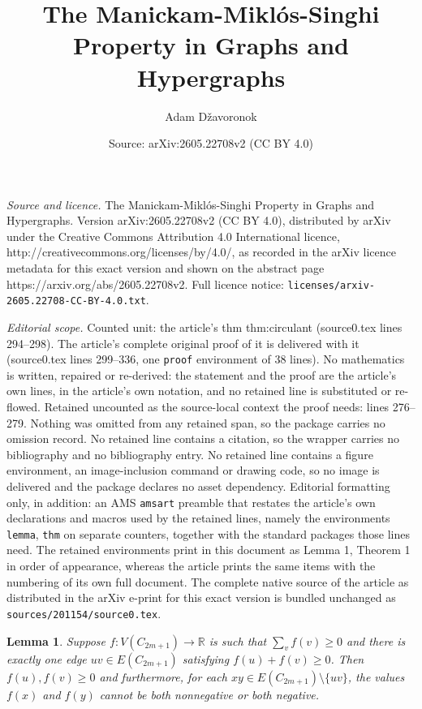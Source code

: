 \documentclass[10pt,a4paper]{amsart}
\title{The Manickam-Mikl\'os-Singhi Property in Graphs and Hypergraphs}
\author{Adam D\v{z}avoronok}
\date{Source: arXiv:2605.22708v2 (CC BY 4.0)}
\newtheorem{lemma}{Lemma}
\begin{document}
\maketitle

\noindent\emph{Source and licence.} The Manickam-Mikl\'os-Singhi Property in Graphs and Hypergraphs. Version arXiv:2605.22708v2 (CC BY 4.0), distributed by arXiv under the Creative Commons Attribution 4.0 International licence, http://creativecommons.org/licenses/by/4.0/, as recorded in the arXiv licence metadata for this exact version and shown on the abstract page https://arxiv.org/abs/2605.22708v2. Full licence notice: \texttt{licenses/arxiv-2605.22708-CC-BY-4.0.txt}.\par\smallskip

\noindent\textit{Editorial scope.} Counted unit: the article's thm thm:circulant (source0.tex lines 294--298). The article's complete original proof of it is delivered with it (source0.tex lines 299--336, one \texttt{proof} environment of 38 lines). No mathematics is written, repaired or re-derived: the statement and the proof are the article's own lines, in the article's own notation, and no retained line is substituted or re-flowed.  Retained uncounted as the source-local context the proof needs: lines 276--279.  Nothing was omitted from any retained span, so the package carries no omission record.  No retained line contains a citation, so the wrapper carries no bibliography and no bibliography entry.  No retained line contains a figure environment, an image-inclusion command or drawing code, so no image is delivered and the package declares no asset dependency.  Editorial formatting only, in addition: an AMS \texttt{amsart} preamble that restates the article's own declarations and macros used by the retained lines, namely the environments \texttt{lemma}, \texttt{thm} on separate counters, together with the standard packages those lines need.  The retained environments print in this document as Lemma 1, Theorem 1 in order of appearance, whereas the article prints the same items with the numbering of its own full document.  The complete native source of the article as distributed in the arXiv e-print for this exact version is bundled unchanged as \texttt{sources/201154/source0.tex}.
 \begin{lemma}\label{lem:unique-cycle}
  Suppose $f:V(C_{2m+1})\rightarrow \mathbb{R}$ is such that $\sum_v f(v)\ge0$ and there is exactly one edge $uv\in E(C_{2m+1})$ satisfying $f(u)+f(v)\ge0$.
 Then $f(u),f(v)\ge0$ and furthermore, for each $xy\in E(C_{2m+1})\setminus\{uv\}$, the values $f(x)$ and $f(y)$ cannot be both nonnegative or both negative.
 \end{lemma}
\end{document}
